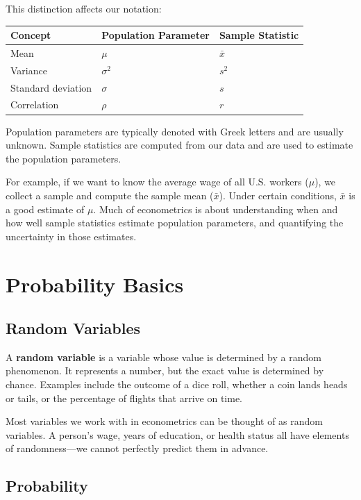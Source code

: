 \documentclass[
  letterpaper,
  DIV=11,
  numbers=noendperiod]{scrreprt}
\newcounter{none} %
\begin{document}
This distinction affects our notation:

{\def\LTcaptype{none} %
\begin{longtable}[]{@{}lll@{}}
\toprule\noalign{}
Concept & Population Parameter & Sample Statistic \\
\midrule\noalign{}
\endhead
\bottomrule\noalign{}
\endlastfoot
Mean & \(\mu\) & \(\bar{x}\) \\
Variance & \(\sigma^2\) & \(s^2\) \\
Standard deviation & \(\sigma\) & \(s\) \\
Correlation & \(\rho\) & \(r\) \\
\end{longtable}
}

Population parameters are typically denoted with Greek letters and are
usually unknown. Sample statistics are computed from our data and are
used to estimate the population parameters.

For example, if we want to know the average wage of all U.S. workers
(\(\mu\)), we collect a sample and compute the sample mean
(\(\bar{x}\)). Under certain conditions, \(\bar{x}\) is a good estimate
of \(\mu\). Much of econometrics is about understanding when and how
well sample statistics estimate population parameters, and quantifying
the uncertainty in those estimates.

\section{Probability Basics}\label{probability-basics}

\subsection{Random Variables}\label{random-variables}

A \textbf{random variable} is a variable whose value is determined by a
random phenomenon. It represents a number, but the exact value is
determined by chance. Examples include the outcome of a dice roll,
whether a coin lands heads or tails, or the percentage of flights that
arrive on time.

Most variables we work with in econometrics can be thought of as random
variables. A person's wage, years of education, or health status all
have elements of randomness---we cannot perfectly predict them in
advance.

\subsection{Probability}\label{probability}
\end{document}
